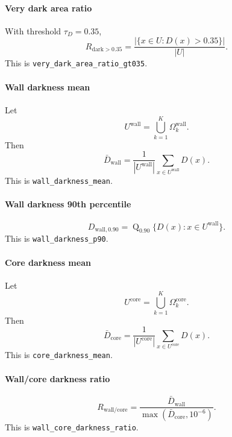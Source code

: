 \documentclass[11pt]{article}
\newcommand{\1}{\mathbf{1}}
\newcommand{\quantile}{\operatorname{Q}}
\newcommand{\unionmask}{U}
\begin{document}
\paragraph{Very dark area ratio}
With threshold $\tau_D=0.35$,
\begin{equation}
R_{\mathrm{dark}>0.35} = \frac{|\{x\in\unionmask : D(x) > 0.35\}|}{|\unionmask|}.
\end{equation}
This is \texttt{very\_dark\_area\_ratio\_gt035}.

\paragraph{Wall darkness mean}
Let
\begin{equation}
\unionmask^{\mathrm{wall}} = \bigcup_{k=1}^{K} \Omega_k^{\mathrm{wall}}.
\end{equation}
Then
\begin{equation}
\bar{D}_{\mathrm{wall}} = \frac{1}{|\unionmask^{\mathrm{wall}}|}\sum_{x\in\unionmask^{\mathrm{wall}}} D(x).
\end{equation}
This is \texttt{wall\_darkness\_mean}.

\paragraph{Wall darkness 90th percentile}
\begin{equation}
D_{\mathrm{wall},0.90} = \quantile_{0.90}\{D(x): x\in\unionmask^{\mathrm{wall}}\}.
\end{equation}
This is \texttt{wall\_darkness\_p90}.

\paragraph{Core darkness mean}
Let
\begin{equation}
\unionmask^{\mathrm{core}} = \bigcup_{k=1}^{K} \Omega_k^{\mathrm{core}}.
\end{equation}
Then
\begin{equation}
\bar{D}_{\mathrm{core}} = \frac{1}{|\unionmask^{\mathrm{core}}|}\sum_{x\in\unionmask^{\mathrm{core}}} D(x).
\end{equation}
This is \texttt{core\_darkness\_mean}.

\paragraph{Wall/core darkness ratio}
\begin{equation}
R_{\mathrm{wall/core}} = \frac{\bar{D}_{\mathrm{wall}}}{\max(\bar{D}_{\mathrm{core}}, 10^{-6})}.
\end{equation}
This is \texttt{wall\_core\_darkness\_ratio}.
\end{document}
